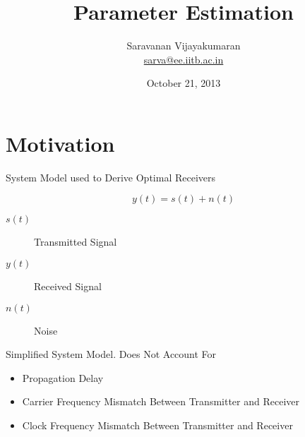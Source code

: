 \documentclass[t]{beamer}
\title[EE 703 DMT]{Parameter Estimation}
\author[Saravanan V]
{
  Saravanan Vijayakumaran\\
  \href{mailto:sarva@ee.iitb.ac.in}{sarva@ee.iitb.ac.in}
}
\institute[IIT Bombay]
{
  Department of Electrical Engineering\\
  Indian Institute of Technology Bombay
}
\date{October 21, 2013}
\begin{document}
\begin{frame}
  \titlepage
\end{frame}

\section{Motivation}
\begin{frame}{System Model used to Derive Optimal Receivers}
  \footnotesize
  \begin{figure}
    \centering
  \end{figure}
  \pause
  \begin{equation*}
    y(t) = s(t) + n(t)
  \end{equation*}
  \pause
  \begin{description}
    \item[$s(t)$] Transmitted Signal
    \pause
    \item[$y(t)$] Received Signal
    \pause
    \item[$n(t)$] Noise
  \end{description}
  \pause
  Simplified System Model. \pause Does Not Account For 
  \begin{itemize}
    \item \pause Propagation Delay
    \item \pause Carrier Frequency Mismatch Between Transmitter and Receiver
    \item \pause Clock Frequency Mismatch Between Transmitter and Receiver
  \end{itemize}
  \normalsize
\end{frame}
\end{document}
